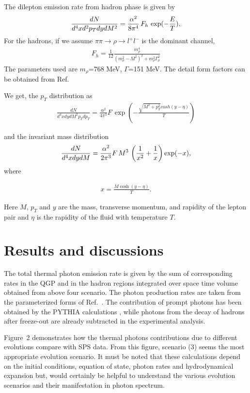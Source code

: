 \documentclass[aps,prc,preprint,superscriptaddress,showpacs,showkeys]{revtex4-1}
\begin{document}
The dilepton emission rate from hadron phase is given by
\begin{eqnarray}\label{}
\frac{dN}{d^4x d^2p_T dy dM^2} = \frac{\alpha^2}{8\pi^4}\, F_h \,
 \exp(-{E\over T}),
\end{eqnarray}
For the hadrons, if we assume 
$\pi\pi \rightarrow \rho \rightarrow l^+l^-$ is the dominant channel, 
\begin{eqnarray}\label{}
F_h = \frac{1}{12} \frac{m_\rho^4}{(m_\rho^2-M^2)^2 + m_\rho^2 \Gamma_\rho^2}
\end{eqnarray}
The parameters used are $m_\rho$=768 MeV, $\Gamma$=151 MeV. The detail
form factors can be obtained from Ref.~\cite{GALE}

We get, the $p_T$ distribution as
\begin{eqnarray}\label{}
\frac{dN}{d^4x dy dM^2 p_T dp_T } = \frac{\alpha^2}{4\pi^3}  F \,
   \exp\left(-\frac{ \sqrt{M^2 + p_T^2} cosh (y-\eta)}{T}\right)
\end{eqnarray}

and the invariant mass distribution 
\begin{eqnarray}\label{}
\frac{dN}{d^4x dy dM} = \frac{\alpha^2}{2\pi^3} F \, M^3 \,
\left({1\over x^2} + {1\over x}\right) \exp(-x),
\end{eqnarray}
where

\begin{eqnarray}\label{}
x=\frac{ M \cosh (y-\eta)}{T}.
\end{eqnarray}

Here $M$, $p_T$ and $y$ are the mass, transverse momentum,
and  rapidity of the lepton pair and $\eta$ is the rapidity
of the fluid with temperature $T$.

\section{Results and discussions}

  The total thermal photon emission rate is given by the sum of 
corresponding rates in the QGP and in the hadron regions integrated 
over space time volume obtained from above four scenario. The photon 
production rates are taken from the parameterized forms of Ref.~\cite{THOMA}.
 The contribution of prompt photons has been obtained by the PYTHIA
calculations \cite{GALLMEISTER}, while photons from the decay of hadrons
after freeze-out are already subtracted in the experimental analysis.

   Figure~2 demonstrates how the thermal photons contributions due to 
different evolutions compare with SPS data. 
From this figure, scenario (3) seems the most appropriate evolution scenario. 
 It must be noted that these calculations depend on the initial conditions, 
equation of state, photon rates and hydrodynamical expansion but, would 
certainly be helpful to understand the various evolution scenarios and their 
manifestation in photon spectrum.
\end{document}
